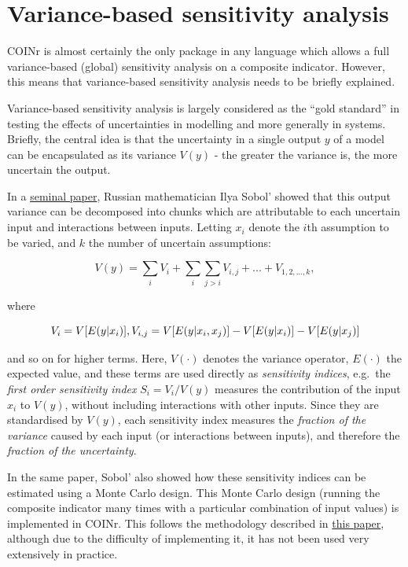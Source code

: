 \documentclass[
]{book}
\begin{document}
\hypertarget{variance-based-sensitivity-analysis}{%
\section{Variance-based sensitivity analysis}\label{variance-based-sensitivity-analysis}}

COINr is almost certainly the only package in any language which allows a full variance-based (global) sensitivity analysis on a composite indicator. However, this means that variance-based sensitivity analysis needs to be briefly explained.

Variance-based sensitivity analysis is largely considered as the ``gold standard'' in testing the effects of uncertainties in modelling and more generally in systems. Briefly, the central idea is that the uncertainty in a single output \(y\) of a model can be encapsulated as its variance \(V(y)\) - the greater the variance is, the more uncertain the output.

In a \href{https://doi.org/10.1016/S0378-4754(00)00270-6}{seminal paper}, Russian mathematician Ilya Sobol' showed that this output variance can be decomposed into chunks which are attributable to each uncertain input and interactions between inputs. Letting \(x_i\) denote the \(i\)th assumption to be varied, and \(k\) the number of uncertain assumptions:

\[ V(y)=\sum_i V_i+\sum_i\sum_{j>i}V_{i,j}+...+V_{1,2,...,k}, \]

where

\[ V_i= V[E(y|x_i)], \\ V_{i,j}=V[E(y|x_i,x_j)] - V[E(y|x_i)]-V[E(y|x_j)] \]

and so on for higher terms. Here, \(V(\cdot)\) denotes the variance operator, \(E(\cdot)\) the expected value, and these terms are used directly as \emph{sensitivity indices}, e.g.~the \emph{first order sensitivity index} \(S_{i}=V_i/V(y)\) measures the contribution of the input \(x_i\) to \(V(y)\), without including interactions with other inputs. Since they are standardised by \(V(y)\), each sensitivity index measures the \emph{fraction of the variance} caused by each input (or interactions between inputs), and therefore the \emph{fraction of the uncertainty}.

In the same paper, Sobol' also showed how these sensitivity indices can be estimated using a Monte Carlo design. This Monte Carlo design (running the composite indicator many times with a particular combination of input values) is implemented in COINr. This follows the methodology described in \href{https://doi.org/10.1111/j.1467-985X.2005.00350.x}{this paper}, although due to the difficulty of implementing it, it has not been used very extensively in practice.
\end{document}
